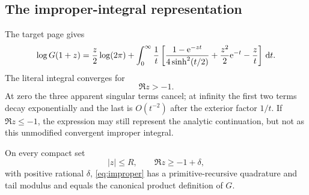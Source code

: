 \subsection{The improper-integral representation}

The target page gives
\begin{equation}\label{eq:improper}
 \log G(1+z)
 =\frac z2\log(2\pi)
 +\int_0^\infty\frac{1}{t}
 \left[
 \frac{1-\mathrm e^{-zt}}{4\sinh^2(t/2)}
 +\frac{z^2}{2}\mathrm e^{-t}-\frac zt
 \right]\,\mathrm d t.
\end{equation}
The literal integral converges for
\begin{equation}\label{eq:improper-domain}
 \Re z>-1.
\end{equation}
At zero the three apparent singular terms cancel; at infinity the first two
terms decay exponentially and the last is \(O(t^{-2})\) after the exterior
factor \(1/t\).  If \(\Re z\le-1\), the expression may still represent the
analytic continuation, but not as this unmodified convergent improper integral.

\begin{theorem}\label{thm:improper}
On every compact set
\[
 |z|\le R,\qquad \Re z\ge-1+\delta,
\]
with positive rational \(\delta\), \cref{eq:improper} has a
primitive-recursive quadrature and tail modulus and equals the canonical
product definition of \(G\).
\end{theorem}

